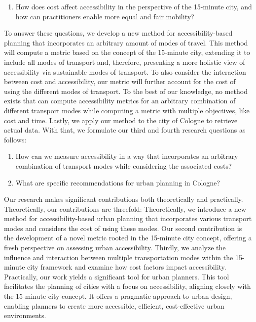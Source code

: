 \begin{enumerate}
  \renewcommand{\labelenumi}{RQ \theenumi.}
  \setcounter{enumi}{1}
  \item How does cost affect accessibility in the perspective of the 15-minute city, and how can practitioners enable more equal and fair mobility?
  \label{rq:cost_accessibility}
\end{enumerate}

To answer these questions, we develop a new method for accessibility-based planning that incorporates an arbitrary amount of modes of travel.
This method will compute a metric based on the concept of the 15-minute city, extending it to include all modes of transport and, therefore, presenting a more holistic view of accessibility via sustainable modes of transport.
To also consider the interaction between cost and accessibility, our metric will further account for the cost of using the different modes of transport.
To the best of our knowledge, no method exists that can compute accessibility metrics for an arbitrary combination of different transport modes while computing a metric with multiple objectives, like cost and time.
Lastly, we apply our method to the city of Cologne to retrieve actual data.
With that, we formulate our third and fourth research questions as follows:

\begin{enumerate}
  \renewcommand{\labelenumi}{RQ \theenumi.}
  \setcounter{enumi}{2}
  \item How can we measure accessibility in a way that incorporates an arbitrary combination of transport modes while considering the associated costs?
  \label{rq:measure_accessibility}
  \item What are specific recommendations for urban planning in Cologne?
  \label{rq:recommendations}
\end{enumerate}

Our research makes significant contributions both theoretically and practically. Theoretically, our contributions are threefold:
Theoretically, we introduce a new method for accessibility-based urban planning that incorporates various transport modes and considers the cost of using these modes.
Our second contribution is the development of a novel metric rooted in the 15-minute city concept, offering a fresh perspective on assessing urban accessibility.
Thirdly, we analyze the influence and interaction between multiple transportation modes within the 15-minute city framework and examine how cost factors impact accessibility.
Practically, our work yields a significant tool for urban planners. 
This tool facilitates the planning of cities with a focus on accessibility, aligning closely with the 15-minute city concept. 
It offers a pragmatic approach to urban design, enabling planners to create more accessible, efficient, cost-effective urban environments.

